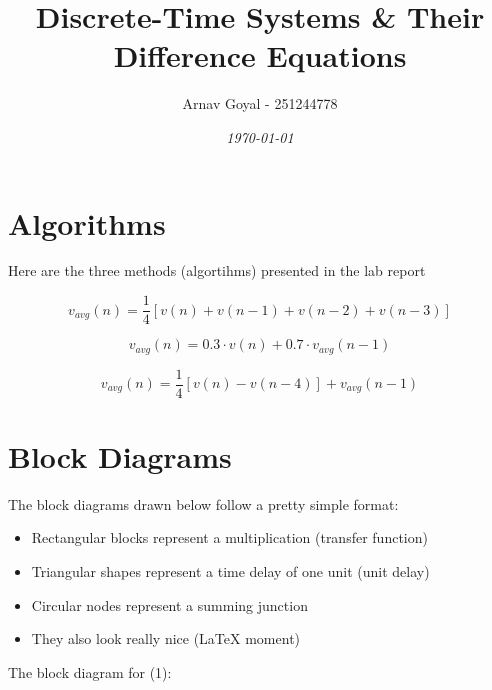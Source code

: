 \documentclass[]{report}
\title{\textbf{Discrete-Time Systems \& Their Difference Equations}}
\date{\textit{\today}}
\author{Arnav Goyal - 251244778}
\begin{document}
	\maketitle
	\section*{Algorithms}
	Here are the three methods (algortihms) presented in the lab report
	
	\begin{equation}
		v_{avg}(n) = \frac{1}{4} \left[  v(n) + v(n-1) + v(n-2) + v(n-3) \right]
	\end{equation}
	
	\begin{equation}
		v_{avg}(n) = 0.3 \cdot v(n) + 0.7 \cdot v_{avg}(n-1)
	\end{equation}
	
	\begin{equation}
		v_{avg}(n) = \frac{1}{4} \left[ v(n) - v(n-4)  \right] + v_{avg}(n-1)
	\end{equation}
	
\section*{Block Diagrams}
	The block diagrams drawn below follow a pretty simple format:
	\begin{itemize}
		\item Rectangular blocks represent a multiplication (transfer function)
		\item Triangular shapes represent a time delay of one unit (unit delay)
		\item Circular nodes represent a summing junction
		\item They also look really nice (\LaTeX \hspace{1pt} moment)
	\end{itemize}
	
	
	The block diagram for (1):
	
\end{document}
